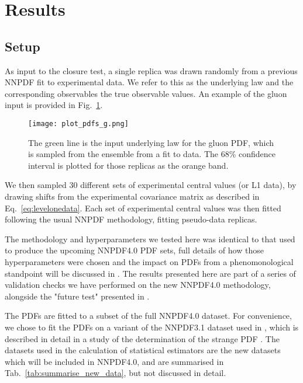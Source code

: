 \section{Results}

\subsection{Setup}

As input to the closure test, a single replica was drawn randomly from
a previous NNPDF fit to experimental data. We refer to this as the underlying
law and the corresponding observables the true observable values. An example
of the gluon input is provided in Fig.~\ref{fig:InputGluonPDF}.

\begin{figure}
    \centering
    \texttt{[image: plot\_pdfs\_g.png]}
    \caption{The green line is the input underlying law for the gluon PDF,
    which is sampled from the ensemble from a fit to data. The 68\% confidence
    interval is plotted for those replicas as the orange band.}
    \label{fig:InputGluonPDF}
\end{figure}

We then sampled 30 different sets of experimental central values (or L1 data),
by drawing
shifts from the experimental covariance matrix as described in
Eq.~\ref{eq:levelonedata}. Each set of experimental central values was then
fitted following the usual NNPDF methodology, fitting pseudo-data replicas.

The methodology and hyperparameters we tested here was identical to that used
to produce the upcoming NNPDF4.0 PDF sets, full details of how those hyperparameters
were chosen and the impact on PDFs from a phenomonological standpoint will be
discussed in \cite{NNPDF40}. %
The results presented here are part of a series of validation checks we have performed
on the new NNPDF4.0 methodology, alongside the "future test" presented in
\cite{Cruz_Martinez_2021}.

The PDFs are fitted to a subset of the full NNPDF4.0 dataset. For convenience,
we chose to fit the PDFs on a variant of the NNPDF3.1 dataset used in
\cite{Ball_2018}, which is described in detail in a study of the determination
of the strange PDF \cite{Faura_2020}. The datasets used in the calculation of
statistical estimators are the new datasets which will be included in NNPDF4.0,
and are summarised in Tab.~\ref{tab:summarise_new_data}, but not discussed in detail.

